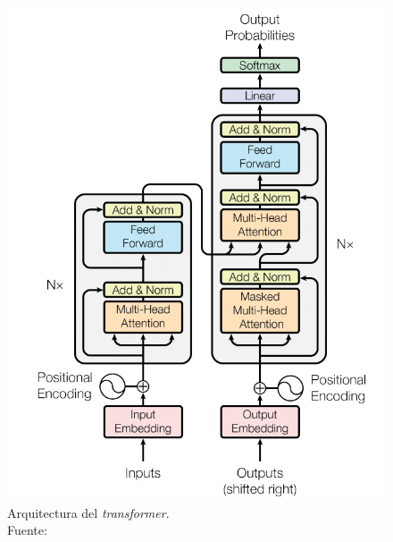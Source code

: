 \documentclass[a4paper, 11pt]{article}
\begin{document}
\vspace{2mm}

\begin{figure}
\includegraphics[width=0.95\linewidth]{imagenes/transformer-arquitectura.png} 
\caption{Arquitectura del \textit{transformer}.\\Fuente: \cite{NIPS2017_3f5ee243}}
\label{fig:arquitectura-transformer}
\end{figure}
\end{document}
